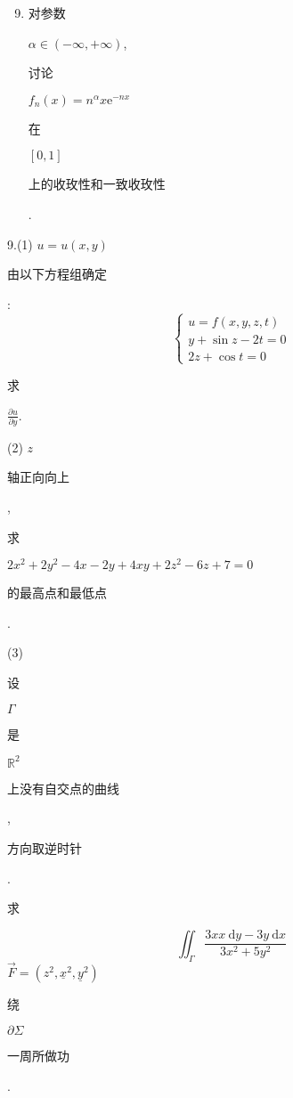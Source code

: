 \documentclass[10pt]{article}
\begin{document}
\begin{enumerate}
  \setcounter{enumi}{8}
  \item \begin{CJK}{UTF8}{mj}对参数\end{CJK} $\alpha \in(-\infty,+\infty)$, \begin{CJK}{UTF8}{mj}讨论\end{CJK} $f_{n}(x)=n^{\alpha} x \mathrm{e}^{-n x}$ \begin{CJK}{UTF8}{mj}在\end{CJK} $[0,1]$ \begin{CJK}{UTF8}{mj}上的收玫性和一致收玫性\end{CJK}.
\end{enumerate}
9.(1) $u=u(x, y)$ \begin{CJK}{UTF8}{mj}由以下方程组确定\end{CJK}:
$$
\left\{\begin{array}{l}
u=f(x, y, z, t) \\
y+\sin z-2 t=0 \\
2 z+\cos t=0
\end{array}\right.
$$
\begin{CJK}{UTF8}{mj}求\end{CJK} $\frac{\partial u}{\partial y}$.

(2) $z$ \begin{CJK}{UTF8}{mj}轴正向向上\end{CJK}, \begin{CJK}{UTF8}{mj}求\end{CJK} $2 x^{2}+2 y^{2}-4 x-2 y+4 x y+2 z^{2}-6 z+7=0$ \begin{CJK}{UTF8}{mj}的最高点和最低点\end{CJK}.

(3) \begin{CJK}{UTF8}{mj}设\end{CJK} $\Gamma$ \begin{CJK}{UTF8}{mj}是\end{CJK} $\mathbb{R}^{2}$ \begin{CJK}{UTF8}{mj}上没有自交点的曲线\end{CJK}, \begin{CJK}{UTF8}{mj}方向取逆时针\end{CJK}. \begin{CJK}{UTF8}{mj}求\end{CJK}
$$
\iint_{\Gamma} \frac{3 x x \mathrm{~d} y-3 y \mathrm{~d} x}{3 x^{2}+5 y^{2}}
$$
$\vec{F}=\left(z^{2}, \underline{x}^{2}, \underline{y}^{2}\right)$ \begin{CJK}{UTF8}{mj}绕\end{CJK} $\partial \Sigma$ \begin{CJK}{UTF8}{mj}一周所做功\end{CJK}.
\end{document}
